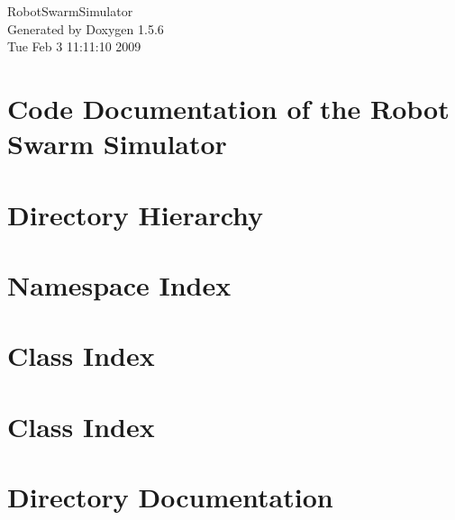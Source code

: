 \documentclass[a4paper]{book}
\begin{document}
\begin{titlepage}
\vspace*{7cm}
\begin{center}
{\Large RobotSwarmSimulator }\\
\vspace*{1cm}
{\large Generated by Doxygen 1.5.6}\\
\vspace*{0.5cm}
{\small Tue Feb 3 11:11:10 2009}\\
\end{center}
\end{titlepage}
\clearemptydoublepage
{}
\tableofcontents
\clearemptydoublepage
{}
\chapter{Code Documentation of the Robot Swarm Simulator}
\label{index}\hypertarget{index}{}
\chapter{Directory Hierarchy}

\chapter{Namespace Index}

\chapter{Class Index}

\chapter{Class Index}

\chapter{Directory Documentation}














\end{document}
